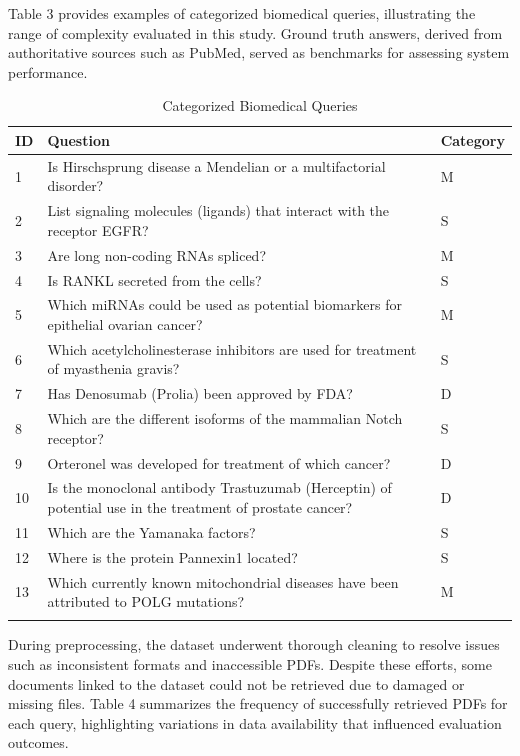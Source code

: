 \documentclass[pdflatex,sn-mathphys-num]{sn-jnl}%
\begin{document}
Table 3 provides examples of categorized biomedical queries, illustrating the range of complexity evaluated in this study. Ground truth answers, derived from authoritative sources such as PubMed, served as benchmarks for assessing system performance.

\begin{table}[h]
\caption{Categorized Biomedical Queries}\label{tab:questions_categories}%
\begin{tabular}{@{}p{}p{}p{}@{}}
\toprule
\textbf{ID} & \textbf{Question} & \textbf{Category} \\
\midrule
1 & Is Hirschsprung disease a Mendelian or a multifactorial disorder? & M \\
2 & List signaling molecules (ligands) that interact with the receptor EGFR? & S \\
3 & Are long non-coding RNAs spliced? & M \\
4 & Is RANKL secreted from the cells? & S \\
5 & Which miRNAs could be used as potential biomarkers for epithelial ovarian cancer? & M \\
6 & Which acetylcholinesterase inhibitors are used for treatment of myasthenia gravis? & S \\
7 & Has Denosumab (Prolia) been approved by FDA? & D \\
8 & Which are the different isoforms of the mammalian Notch receptor? & S \\
9 & Orteronel was developed for treatment of which cancer? & D \\
10 & Is the monoclonal antibody Trastuzumab (Herceptin) of potential use in the treatment of prostate cancer? & D \\
11 & Which are the Yamanaka factors? & S \\
12 & Where is the protein Pannexin1 located? & S \\
13 & Which currently known mitochondrial diseases have been attributed to POLG mutations? & M \\
\botrule
\end{tabular}
\end{table}

During preprocessing, the dataset underwent thorough cleaning to resolve issues such as inconsistent formats and inaccessible PDFs. Despite these efforts, some documents linked to the dataset could not be retrieved due to damaged or missing files. Table 4 summarizes the frequency of successfully retrieved PDFs for each query, highlighting variations in data availability that influenced evaluation outcomes.
\end{document}
